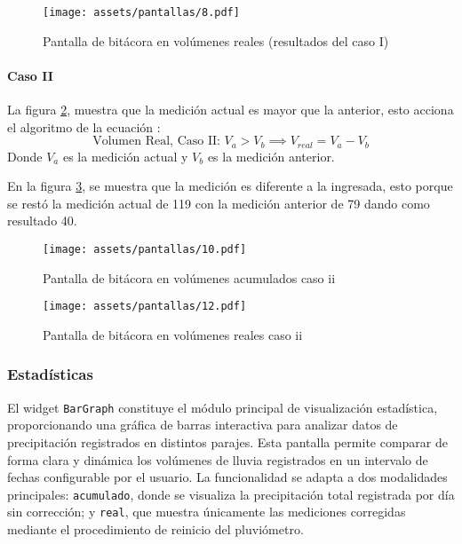 \begin{figure}[h!]
\centering
  \texttt{[image: assets/pantallas/8.pdf]}
  \caption{Pantalla de bitácora en volúmenes reales (resultados del caso I)}
  \label{pantallas8}
\end{figure}

\paragraph{Caso II}

La figura \ref{pantallas10}, muestra que la medición actual es mayor que la anterior, esto acciona el algoritmo de la ecuación :
\begin{equation}
\text{Volumen Real, Caso II: } V_{a}>V_{b}\implies V_{real} = V_{a} - V_{b}
\label{eq2}
\end{equation}
Donde $V_{a}$ es la medición actual y $V_{b}$ es la medición anterior.

En la figura \ref{pantallas11}, se muestra que la medición es diferente a la ingresada, esto porque se restó la medición actual de 119 con la medición anterior de 79 dando como resultado 40.


\begin{figure}[h!]
\centering
  \texttt{[image: assets/pantallas/10.pdf]}
  \caption{Pantalla de bitácora en volúmenes acumulados caso ii}
  \label{pantallas10}
\end{figure}


\begin{figure}[h!]
\centering
  \texttt{[image: assets/pantallas/12.pdf]}
  \caption{Pantalla de bitácora en volúmenes reales caso ii}
  \label{pantallas11}
\end{figure}






\newpage
\subsubsection*{Estadísticas} 

El widget \texttt{BarGraph} constituye el módulo principal de visualización estadística, proporcionando una gráfica de barras interactiva para analizar datos de precipitación registrados en distintos parajes. Esta pantalla permite comparar de forma clara y dinámica los volúmenes de lluvia registrados en un intervalo de fechas configurable por el usuario. La funcionalidad se adapta a dos modalidades principales: \texttt{acumulado}, donde se visualiza la precipitación total registrada por día sin corrección; y \texttt{real}, que muestra únicamente las mediciones corregidas mediante el procedimiento de reinicio del pluviómetro. 

